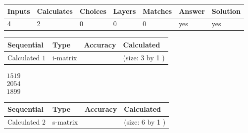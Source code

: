 \documentclass[12pt]{article}
\begin{document}
 
 
\noindent{}
 
 

 
 
 
\noindent{}
 
 

 
 
\noindent{}
 
 

 
\vspace{0.3in}
   
   
   
   
\noindent\begin{tabular}{|l|l|l|l|l|l|l|}
 \hline
Inputs & Calculates & Choices & Layers & Matches & Answer & Solution \\ \hline
           4  & 
           2  & 
           0
  & 
           0  & 
           0  & 
  yes & 
  yes 
  \\ \hline
 \end{tabular}
   
   
   
   
\noindent{}
   
   
  
  
\noindent\begin{tabular}{|l|l|l|l|}
\hline
 Sequential & Type & Accuracy & Calculated \\ 
\hline
 
 
  Calculated $            1 $ & i-matrix &  & 
 (size:            3  by            1 )
 \\  \hline  
 \end{tabular}
   
   
$\begin{array}{
 c
 }
        1519  \\ 
        2054  \\ 
        1899
 \end{array}  $ 
  
  
\noindent\begin{tabular}{|l|l|l|l|}
\hline
 Sequential & Type & Accuracy & Calculated \\ 
\hline
 
 
  Calculated $            2 $ & s-matrix & & 
 (size:            6  by            1 )
 \\  \hline  
 \end{tabular}
   
\end{document}
